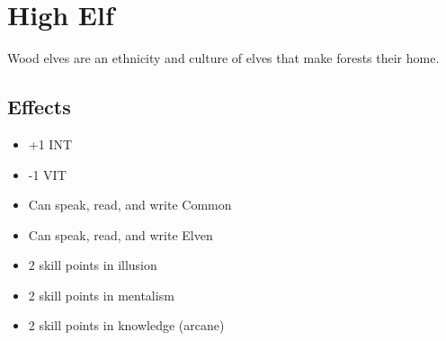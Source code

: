 \section{High Elf}\label{culture:high-elf}
Wood elves are an ethnicity and culture of elves that make forests their
home.

\subsection{Effects}
\begin{itemize}
    \item +1 INT
    \item -1 VIT
    \item Can speak, read, and write Common
    \item Can speak, read, and write Elven
    \item 2 skill points in illusion
    \item 2 skill points in mentalism
    \item 2 skill points in knowledge (arcane)
\end{itemize}
